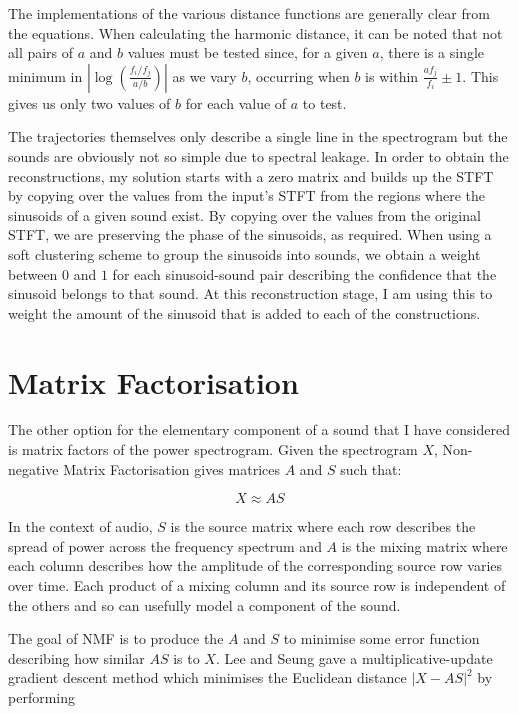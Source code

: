 \documentclass[10pt,twoside,a4paper]{report}
\begin{document}
The implementations of the various distance functions are generally clear from the equations. When calculating the harmonic distance, it can be noted that not all pairs of $ a $ and $ b $ values must be tested since, for a given $ a $, there is a single minimum in $ \left| \log \left( \frac{f_i/f_j}{a/b} \right) \right| $ as we vary $ b $, occurring when $ b $ is within $ \frac{af_j}{f_i} \pm 1 $. This gives us only two values of $ b $ for each value of $ a $ to test.

The trajectories themselves only describe a single line in the spectrogram but the sounds are obviously not so simple due to spectral leakage. In order to obtain the reconstructions, my solution starts with a zero matrix and builds up the STFT by copying over the values from the input's STFT from the regions where the sinusoids of a given sound exist. By copying over the values from the original STFT, we are preserving the phase of the sinusoids, as required. When using a soft clustering scheme to group the sinusoids into sounds, we obtain a weight between $ 0 $ and $ 1 $ for each sinusoid-sound pair describing the confidence that the sinusoid belongs to that sound. At this reconstruction stage, I am using this to weight the amount of the sinusoid that is added to each of the constructions.

\section{Matrix Factorisation}

The other option for the elementary component of a sound that I have considered is matrix factors of the power spectrogram. Given the spectrogram $ X $, Non-negative Matrix Factorisation gives matrices $ A $ and $ S $ such that:

\begin{equation}
X \approx AS
\end{equation}

In the context of audio, $ S $ is the source matrix where each row describes the spread of power across the frequency spectrum and $ A $ is the mixing matrix where each column describes how the amplitude of the corresponding source row varies over time. Each product of a mixing column and its source row is independent of the others and so can usefully model a component of the sound.

The goal of NMF is to produce the $ A $ and $ S $ to minimise some error function describing how similar $ AS $ is to $ X $. Lee and Seung \cite{lee2001algorithms} gave a multiplicative-update gradient descent method which minimises the Euclidean distance $ \left| X - AS \right|^2 $ by performing
\end{document}
